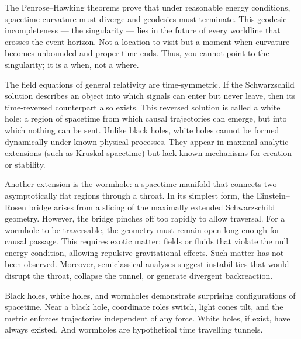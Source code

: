 The Penrose–Hawking theorems prove that under reasonable energy conditions, spacetime curvature must diverge and geodesics must terminate. This geodesic incompleteness — the singularity — lies in the future of every worldline that crosses the event horizon. Not a location to visit but a moment when curvature becomes unbounded and proper time ends. Thus, you cannot point to the singularity; it is a when, not a where. 

The field equations of general relativity are time-symmetric. If the Schwarzschild solution describes an object into which signals can enter but never leave, then its time-reversed counterpart also exists. This reversed solution is called a white hole: a region of spacetime from which causal trajectories can emerge, but into which nothing can be sent. Unlike black holes, white holes cannot be formed dynamically under known physical processes. They appear in maximal analytic extensions (such as Kruskal spacetime) but lack known mechanisms for creation or stability. 

Another extension is the wormhole: a spacetime manifold that connects two asymptotically flat regions through a throat. In its simplest form, the Einstein–Rosen bridge arises from a slicing of the maximally extended Schwarzschild geometry. However, the bridge pinches off too rapidly to allow traversal. For a wormhole to be traversable, the geometry must remain open long enough for causal passage. This requires exotic matter: fields or fluids that violate the null energy condition, allowing repulsive gravitational effects. Such matter has not been observed. Moreover, semiclassical analyses suggest instabilities that would disrupt the throat, collapse the tunnel, or generate divergent backreaction.

Black holes, white holes, and wormholes demonstrate surprising configurations of spacetime. Near a black hole, coordinate roles switch, light cones tilt, and the metric enforces trajectories independent of any force. White holes, if exist, have always existed. And wormholes are hypothetical time travelling tunnels.

\newpage

